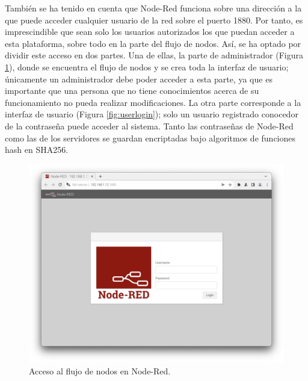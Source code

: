 También se ha tenido en cuenta que Node-Red funciona sobre una dirección a la que puede acceder cualquier usuario de la red sobre el puerto 1880. Por tanto, es imprescindible que sean solo los usuarios autorizados los que puedan acceder a esta plataforma, sobre todo en la parte del flujo de nodos. Así, se ha optado por dividir este acceso en dos partes. Una de ellas, la parte de administrador (Figura \ref{fig:adminlogin}), donde se encuentra el flujo de nodos y se crea toda la interfaz de usuario; únicamente un administrador debe poder acceder a esta parte, ya que es importante que una persona que no tiene conocimientos acerca de su funcionamiento no pueda realizar modificaciones. La otra parte corresponde a la interfaz de usuario (Figura \ref{fig:userlogin}); solo un usuario registrado conocedor de la contraseña puede acceder al sistema. Tanto las contraseñas de Node-Red como las de los servidores se guardan encriptadas bajo algoritmos de funciones hash en SHA256.\\ 
\begin{figure} [h!]
  \begin{center}
    \includegraphics[width=12cm]{figs/adminlogin}
  \end{center}
  \caption{Acceso al flujo de nodos en Node-Red.}
  \label{fig:adminlogin}
\end{figure}


